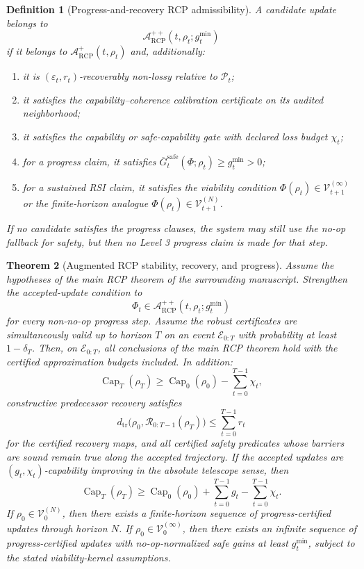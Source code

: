 \documentclass[11pt]{article}
\newtheorem{theorem}{Theorem}[section]
\newtheorem{definition}[theorem]{Definition}
\newcommand{\Acal}{\mathcal{A}}
\newcommand{\Pcal}{\mathcal{P}}
\newcommand{\Ecal}{\mathcal{E}}
\newcommand{\Rcal}{\mathcal{R}}
\newcommand{\1}{\mathbf{1}}
\newcommand{\eps}{\varepsilon}
\newcommand{\RCP}{\mathrm{RCP}}
\newcommand{\safe}{\mathrm{safe}}
\renewcommand{\Cap}{\operatorname{Cap}}
\providecommand{\Vcal}{\mathcal{V}}
\begin{document}
\begin{definition}[Progress-and-recovery RCP admissibility]
A candidate update belongs to
\[
\Acal_{\RCP}^{++}(t,\rho_t;g_t^{\min})
\]
if it belongs to \(\Acal_{\RCP}^{+}(t,\rho_t)\) and, additionally:
\begin{enumerate}[label=(\alph*)]
    \item it is \((\eps_t,r_t)\)-recoverably non-lossy relative to \(\Pcal_t\);
    \item it satisfies the capability--coherence calibration certificate on its audited neighborhood;
    \item it satisfies the capability or safe-capability gate with declared loss budget \(\chi_t\);
    \item for a progress claim, it satisfies \(\overline G_t^{\safe}(\Phi;\rho_t)\ge g_t^{\min}>0\);
    \item for a sustained RSI claim, it satisfies the viability condition \(\Phi(\rho_t)\in\Vcal_{t+1}^{(\infty)}\) or the finite-horizon analogue \(\Phi(\rho_t)\in\Vcal_{t+1}^{(N)}\).
\end{enumerate}
If no candidate satisfies the progress clauses, the system may still use the no-op fallback for safety, but then no Level 3 progress claim is made for that step.
\end{definition}

\begin{theorem}[Augmented RCP stability, recovery, and progress]
\label{thm:augmented_rcp}
Assume the hypotheses of the main RCP theorem of the surrounding manuscript.  Strengthen the accepted-update condition to
\[
\Phi_t\in\Acal_{\RCP}^{++}(t,\rho_t;g_t^{\min})
\]
for every non-no-op progress step.  Assume the robust certificates are simultaneously valid up to horizon \(T\) on an event \(\Ecal_{0:T}\) with probability at least \(1-\delta_T\).  Then, on \(\Ecal_{0:T}\), all conclusions of the main RCP theorem hold with the certified approximation budgets included.  In addition:
\[
\Cap_T(\rho_T)
\ge
\Cap_0(\rho_0)-\sum_{t=0}^{T-1}\chi_t,
\]
constructive predecessor recovery satisfies
\[
d_{\mathrm{tr}}\bigl(\rho_0,
\Rcal_{0:T-1}(\rho_T)\bigr)
\le
\sum_{t=0}^{T-1}r_t
\]
for the certified recovery maps, and all certified safety predicates whose barriers are sound remain true along the accepted trajectory.  If the accepted updates are \((g_t,\chi_t)\)-capability improving in the absolute telescope sense, then
\[
\Cap_T(\rho_T)
\ge
\Cap_0(\rho_0)+\sum_{t=0}^{T-1}g_t-
\sum_{t=0}^{T-1}\chi_t.
\]
If \(\rho_0\in\Vcal_0^{(N)}\), then there exists a finite-horizon sequence of progress-certified updates through horizon \(N\).  If \(\rho_0\in\Vcal_0^{(\infty)}\), then there exists an infinite sequence of progress-certified updates with no-op-normalized safe gains at least \(g_t^{\min}\), subject to the stated viability-kernel assumptions.
\end{theorem}
\end{document}
